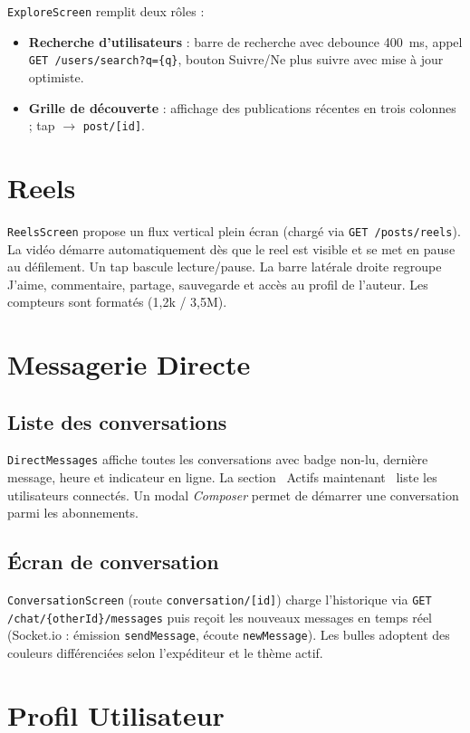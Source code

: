 \texttt{ExploreScreen} remplit deux rôles :
\begin{itemize}
  \item \textbf{Recherche d'utilisateurs} : barre de recherche avec debounce 400~ms, appel \texttt{GET /users/search?q=\{q\}}, bouton Suivre/Ne plus suivre avec mise à jour optimiste.
  \item \textbf{Grille de découverte} : affichage des publications récentes en trois colonnes ; tap $\to$ \texttt{post/[id]}.
\end{itemize}

\section{Reels}

\texttt{ReelsScreen} propose un flux vertical plein écran (chargé via \texttt{GET /posts/reels}). La vidéo démarre automatiquement dès que le reel est visible et se met en pause au défilement. Un tap bascule lecture/pause. La barre latérale droite regroupe J'aime, commentaire, partage, sauvegarde et accès au profil de l'auteur. Les compteurs sont formatés (1,2k / 3,5M).

\section{Messagerie Directe}

\subsection{Liste des conversations}
\texttt{DirectMessages} affiche toutes les conversations avec badge non-lu, dernière message, heure et indicateur en ligne. La section \og~Actifs maintenant~\fg{} liste les utilisateurs connectés. Un modal \textit{Composer} permet de démarrer une conversation parmi les abonnements.

\subsection{Écran de conversation}
\texttt{ConversationScreen} (route \texttt{conversation/[id]}) charge l'historique via \texttt{GET /chat/\{otherId\}/messages} puis reçoit les nouveaux messages en temps réel (Socket.io : émission \texttt{sendMessage}, écoute \texttt{newMessage}). Les bulles adoptent des couleurs différenciées selon l'expéditeur et le thème actif.

\section{Profil Utilisateur}

